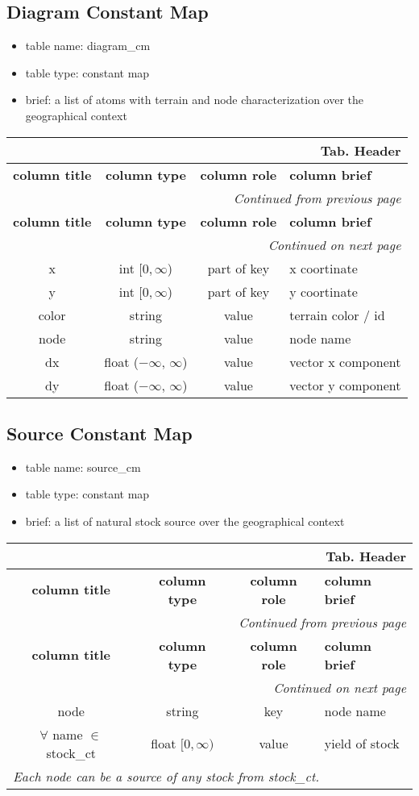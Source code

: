\documentclass[a4paper,oneside,titlepage]{report}
\newcommand*{\LTHeaderIV}[5]{
  \multicolumn{4}{r}{\textbf{Tab. \thesubsection} \textbf{#1}}\\    
  \hline
  \textbf{#2} & \textbf{#3} & \textbf{#4} & \textbf{#5}\\
  \hline
  
  \endfirsthead
  \multicolumn{4}{r}{\textit{Continued from previous page}}\\    
  \hline
  \textbf{#2} & \textbf{#3} & \textbf{#4} & \textbf{#5}\\
  \hline
  \endhead
  \hline
  \multicolumn{4}{r}{\textit{Continued on next page}}\\
  \endfoot
  \hline
  \endlastfoot  
}
\begin{document}
\subsection{Diagram Constant Map}
\begin{itemize}
  \setlength{\itemsep}{0pt}
  \setlength{\parskip}{0pt}
\item table name: diagram\_cm  
\item table type: constant map  
\item brief: a list of atoms with terrain and node characterization over the geographical context
\end{itemize}

\begin{longtable}{ |c|c|c|l| } 
  \LTHeaderIV{Header}{column title}{column type}{column role}{column brief}                    
  x & int $[0, \infty$) & part of key & x coortinate\\
  y & int $[0, \infty$) & part of key & y coortinate\\
  color & string & value & terrain color $/$ id\\
  node & string & value & node name\\
  dx & float ($-\infty$, $\infty$) & value & vector x component\\
  dy & float ($-\infty$, $\infty$) & value & vector y component\\
\end{longtable}        

\subsection{Source Constant Map}
\begin{itemize}
  \setlength{\itemsep}{0pt}
  \setlength{\parskip}{0pt}
\item table name: source\_cm  
\item table type: constant map  
\item brief: a list of natural stock source over the geographical context
\end{itemize}

\begin{longtable}{ |c|c|c|l| } 
  \LTHeaderIV{Header}{column title}{column type}{column role}{column brief}                    
  node & string & key & node name\\
  $\forall$ name $\in$ stock\_ct & float $[0, \infty)$ & value & yield of stock \\
  \multicolumn{4}{|l|}{\textit{Each node can be a source of any stock from stock\_ct.}}\\
\end{longtable}        
\end{document}
